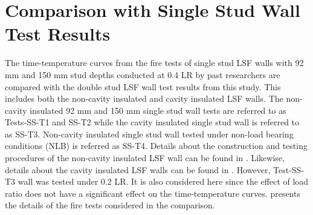 \section{Comparison with Single Stud Wall Test Results}

The time-temperature curves from the fire tests of single stud LSF walls with 92 mm and 150 mm stud depths conducted at 0.4 LR by past researchers are compared with the double stud LSF wall test results from this study. This includes both the non-cavity insulated and cavity insulated LSF walls. The non-cavity insulated 92 mm and 150 mm single stud wall tests are referred to as Tests-SS-T1 and SS-T2 while the cavity insulated single stud wall is referred to as SS-T3. Non-cavity insulated single stud wall tested under non-load bearing conditions (NLB) is referred as SS-T4. Details about the construction and testing procedures of the non-cavity insulated LSF wall can be found in \citet{Ariyanayagam2018c}. Likewise, details about the cavity insulated LSF walls can be found in \citet{Gunalan2013e}. However, Test-SS-T3 wall was tested under 0.2 LR. It is also considered here since the effect of load ratio does not have a significant effect on the time-temperature curves.  presents the details of the fire tests considered in the comparison.  

